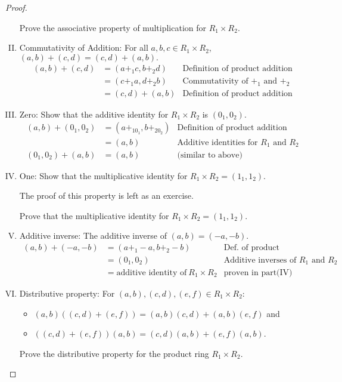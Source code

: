 \begin{proof}
\begin{enumerate}[(I)]
\begin{exercise}
Prove the associative property of multiplication for $R_1 \times R_2$.
\end{exercise}
\item Commutativity of Addition:  For all $a,b,c\in R_1\times R_2$,\\ 
$(a,b)+(c,d)=(c,d)+(a,b).$
\begin{align*}
(a,b)+(c,d)&=(a+_1c,b+_2d) & \text{Definition of product addition}\\
&=(c+_1a,d+_2b) & \text{Commutativity of $+_1$ and $+_2$}\\
&=(c,d)+(a,b) & \text{Definition of product addition}
\end{align*}
\item Zero: Show that the additive identity for $R_1\times R_2$ is $(0_1,0_2)$.
\begin{align*}
(a,b)+(0_1,0_2)&=(a+_10_1,b+_20_2) & \text{Definition of product addition}\\
&=(a,b) & \text{Additive identities for $R_1$ and $R_2$}\\
(0_1,0_2)+(a,b)&=(a,b) & \text{(similar to above)}
\end{align*}
\item One: Show that the multiplicative identity for $R_1\times R_2=(1_1,1_2)$.

The proof of this property is left as an exercise.

\begin{exercise}
Prove that the multiplicative identity for $R_1\times R_2=(1_1,1_2)$.
\end{exercise}

\item Additive inverse:  The additive inverse of $(a,b)=(-a,-b)$.
\begin{align*}
(a,b)+(-a,-b)&=(a+_1-a,b+_2-b) & \text{Def.  of product addition}\\
&=(0_1,0_2) & \text{Additive inverses of $R_1$ and $R_2$}\\
&=\text{additive~identity~of}~R_1\times R_2 & \text{proven in part(IV)}
\end{align*}
\item Distributive property:  For $(a,b),(c,d),(e,f) \in  R_1 \times R_2$:
\begin{itemize}
\item $(a,b)((c,d)+(e,f)) = (a,b)(c,d)+(a,b)(e,f)$ and 
\item $((c,d)+(e,f))(a,b) = (c,d)(a,b)+(e,f)(a,b)$.
\end{itemize}
\begin{exercise}
Prove the distributive property for the product ring $R_1 \times R_2$.
\end{exercise}
\end{enumerate}
\end{proof}

